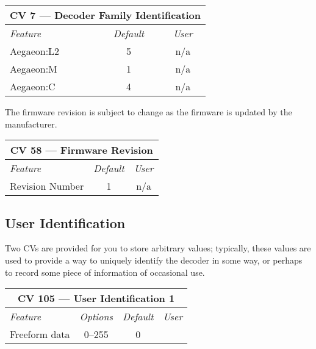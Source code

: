 \documentclass[12pt,letterpaper,draft]{memoir} %
\begin{document}
\label{CV7}
\begin{center}
\begin{tabular}{|l|c|c|}
\hline
\multicolumn{3}{|c|}{\textbf{CV 7 --- Decoder Family Identification}} \\ \hline \hline
\textit{Feature}& \textit{Default} & \textit{User} \\ \hline
Aegaeon:L2 & 5 & n/a\\ \hline
Aegaeon:M & 1 & n/a\\ \hline
Aegaeon:C & 4 & n/a\\ \hline
\end{tabular}
\end{center}

The firmware revision is subject to change as the firmware is updated by the manufacturer.
\label{CV58}
\begin{center}
\begin{tabular}{|l|c|c|}
\hline
\multicolumn{3}{|c|}{\textbf{CV 58 --- Firmware Revision}} \\ \hline \hline
\textit{Feature}& \textit{Default} & \textit{User} \\ \hline
Revision Number & 1 & n/a\\ \hline
\end{tabular}
\end{center}


\subsection{User Identification}
\label{UserIdentification}
Two CVs are provided for you to store arbitrary values; typically, these values are used to provide a way to uniquely identify the decoder in some way, or perhaps to record some piece of information of occasional use.

\label{CV105}
\begin{center}
\begin{tabular}{|l|c|c|c|}
\hline
\multicolumn{4}{|c|}{\textbf{CV 105 --- User Identification 1}} \\ \hline \hline
\textit{Feature} & \textit{Options} & \textit{Default} & \textit{User} \\ \hline
Freeform data & 0--255 & 0 &\\ \hline
\end{tabular}
\end{center}
\end{document}
